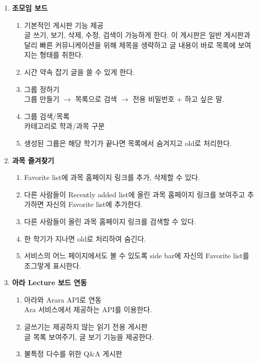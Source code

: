 \documentclass[a4paper,titlepage]{article}
\begin{document}
\begin{enumerate}
	\item\textbf{조모임 보드}
	\begin{enumerate}
		\item 기본적인 게시판 기능 제공\\
		글 쓰기, 보기, 삭제, 수정, 검색이 가능하게 한다.
		이 게시판은 일반 게시판과 달리 빠른 커뮤니케이션을 위해 제목을 생략하고 글 내용이 바로 목록에 보여지는 형태를 취한다.
		\item 시간 약속 잡기 글을 쓸 수 있게 한다.
		\item 그룹 정하기\\
		그룹 만들기 $\rightarrow$ 목록으로 검색 $\rightarrow$ 전용 비밀번호 + 하고 싶은 말.
		\item 그룹 검색/목록\\
		카테고리로 학과/과목 구분
		\item 생성된 그룹은 해당 학기가 끝나면 목록에서 숨겨지고 old로 처리한다. 
	\end{enumerate}
	\item\textbf{과목 즐겨찾기}
	\begin{enumerate}
		\item Favorite list에 과목 홈페이지 링크를 추가, 삭제할 수 있다.
		\item 다른 사람들이 Recently added list에 올린 과목 홈페이지 링크를 보여주고 추가하면 자신의 Favorite list에 추가한다.
		\item 다른 사람들이 올린 과목 홈페이지 링크를 검색할 수 있다.
		\item 한 학기가 지나면 old로 처리하여 숨긴다.
		\item 서비스의 어느 페이지에서도 볼 수 있도록 side bar에 자신의 Favorite list를 조그맣게 표시한다.
	\end{enumerate}
	\item\textbf{아라 Lecture 보드 연동}
	\begin{enumerate}
		\item 아라와 Arara API로 연동\\
		Ara 서비스에서 제공하는 API를 이용한다. 
		\item 글쓰기는 제공하지 않는 읽기 전용 게시판\\
		글 목록 보여주기, 글 보기 기능을 제공한다. 
		\item 불특정 다수를 위한 Q\&A 게시판
	\end{enumerate}
\end{enumerate}
\end{document}

